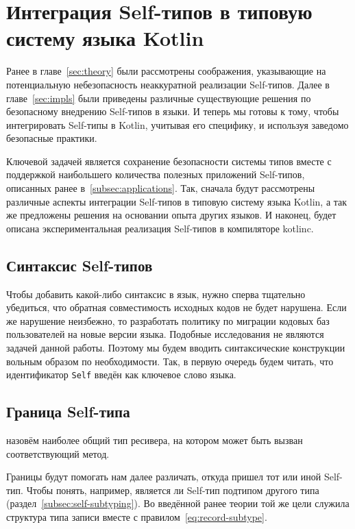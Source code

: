 \section{Интеграция Self-типов в типовую систему языка Kotlin} \label{sec:integration}

Ранее в главе~\ref{sec:theory} были рассмотрены соображения, указывающие на потенциальную небезопасность неаккуратной реализации Self-типов.
Далее в главе~\ref{sec:impls} были приведены различные существующие решения по безопасному внедрению Self-типов в языки.
И теперь мы готовы к тому, чтобы интегрировать Self-типы в Kotlin, учитывая его специфику, и используя заведомо безопасные практики.

Ключевой задачей является сохранение безопасности системы типов вместе с поддержкой наибольшего количества полезных приложений Self-типов, описанных ранее в~\ref{subsec:applications}.
Так, сначала будут рассмотрены различные аспекты интеграции Self-типов в типовую систему языка Kotlin, а так же предложены решения на основании опыта других языков.
И наконец, будет описана экспериментальная реализация Self-типов в компиляторе kotlinc.


\subsection{Синтаксис Self-типов} \label{subsec:syntax}

Чтобы добавить какой-либо синтаксис в язык, нужно сперва тщательно убедиться, что обратная совместимость исходных кодов не будет нарушена.
Если же нарушение неизбежно, то разработать политику по миграции кодовых баз пользователей на новые версии языка.
Подобные исследования не являются задачей данной работы.
Поэтому мы будем вводить синтаксические конструкции вольным образом по необходимости.
Так, в первую очередь будем читать, что идентификатор \texttt{Self} введён как ключевое слово языка.


\subsection{Граница Self-типа} \label{subsec:bound}

\begin{definition}
    \label{def:bound}
     назовём наиболее общий тип ресивера, на котором может быть вызван соответствующий метод.
\end{definition}

Границы будут помогать нам далее различать, откуда пришел тот или иной Self-тип.
Чтобы понять, например, является ли Self-тип подтипом другого типа (раздел~\ref{subsec:self-subtyping}).
Во введённой ранее теории той же цели служила структура типа записи вместе с правилом~\eqref{eq:record-subtype}.

